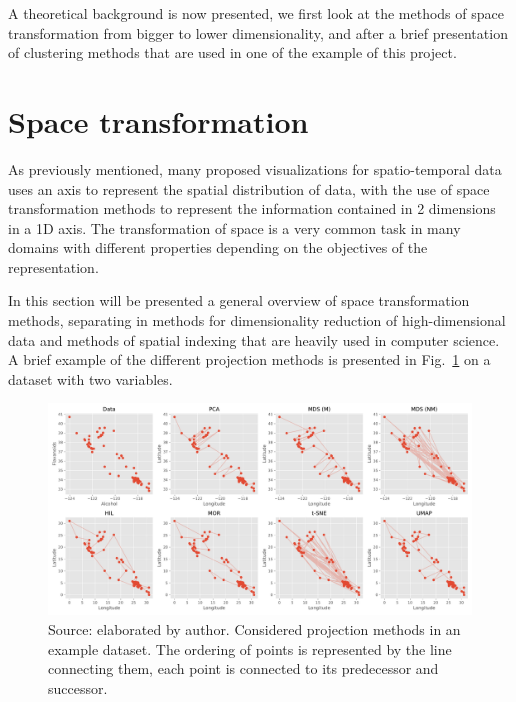 \label{ch:background}

A theoretical background is now presented, we first look at the methods of space transformation from bigger to lower dimensionality, and after a brief presentation of clustering methods that are used in one of the example of this project. 

\section{Space transformation}
\label{seq:space-transformation}

As previously mentioned, many proposed visualizations for spatio-temporal data uses an axis to represent the spatial distribution of data,
%
with the use of space transformation methods to represent the information contained in 2 dimensions in a 1D axis.
%
The transformation of space is a very common task in many domains with different properties depending on the objectives of the representation.

%
In this section will be presented a general overview of space transformation methods, 
%
separating in methods for dimensionality reduction of high-dimensional data and methods of spatial indexing that are heavily used in computer science.
%
A brief example of the different projection methods is presented in Fig.~\ref{fig:projection-example} on a dataset with two variables.

\begin{figure}
    \centering
    \includegraphics[width = \textwidth]{src/imgs/projection-example.pdf}
    \caption{Source: elaborated by author. Considered projection methods in an example dataset. The ordering of points is represented by the line connecting them, each point is connected to its predecessor and successor.}
    \label{fig:projection-example}
\end{figure}

